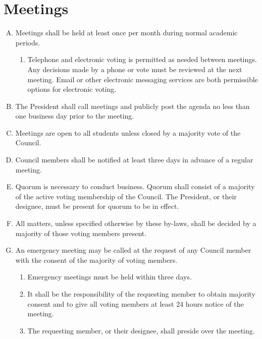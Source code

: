 \documentclass[letterpaper,12pt]{article}
\begin{document}
\section{Meetings}
\begin{enumerate}[A.]
	\item Meetings shall be held at least once per month during normal
	academic periods.
	\begin{enumerate}[1.]
		\item Telephone and electronic voting is permitted as needed between
		meetings. Any decisions made by a phone or vote must be reviewed
		at the next meeting. Email or other electronic messaging services
		are both permissible options for electronic voting.
	\end{enumerate} 
	\item The President shall call meetings and publicly post the agenda no less
	than one business day prior to the meeting.
	\item Meetings are open to all students unless closed by a majority vote of
	the Council.
	\item Council members shall be notified at least three days in advance of a
	regular meeting.
	\item Quorum is necessary to conduct business. Quorum shall consist of a
	majority of the active voting membership of the Council. The
	President, or their designee, must be present for quorum to be in
	effect.
	\item All matters, unless specified otherwise by these by-laws, shall be
	decided by a majority of those voting members present.
	\item An emergency meeting may be called at the request of any Council
	member with the consent of the majority of voting members.
	\begin{enumerate}[1.]
		\item Emergency meetings must be held within three days.
		\item It shall be the responsibility of the requesting member to obtain
		majority consent and to give all voting members at least 24 hours
		notice of the meeting.
		\item The requesting member, or their designee, shall preside over
		the meeting.
	\end{enumerate}
\end{enumerate}
\end{document}
